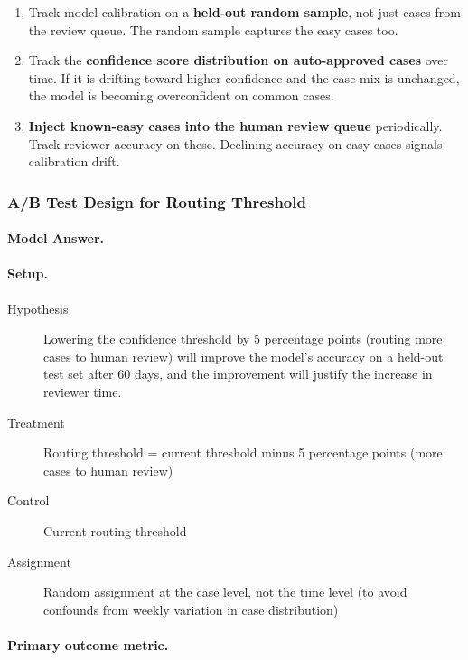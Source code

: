 \begin{enumerate}
    \item Track model calibration on a \textbf{held-out random sample}, not just cases from the review queue. The random sample captures the easy cases too.
    \item Track the \textbf{confidence score distribution on auto-approved cases} over time. If it is drifting toward higher confidence and the case mix is unchanged, the model is becoming overconfident on common cases.
    \item \textbf{Inject known-easy cases into the human review queue} periodically. Track reviewer accuracy on these. Declining accuracy on easy cases signals calibration drift.
\end{enumerate}

\subsubsection{A/B Test Design for Routing Threshold}

\paragraph{Model Answer.}

\paragraph{Setup.}

\begin{description}
    \item[Hypothesis] Lowering the confidence threshold by 5 percentage points (routing more cases to human review) will improve the model's accuracy on a held-out test set after 60 days, and the improvement will justify the increase in reviewer time.
    \item[Treatment] Routing threshold = current threshold minus 5 percentage points (more cases to human review)
    \item[Control] Current routing threshold
    \item[Assignment] Random assignment at the case level, not the time level (to avoid confounds from weekly variation in case distribution)
\end{description}

\paragraph{Primary outcome metric.}

